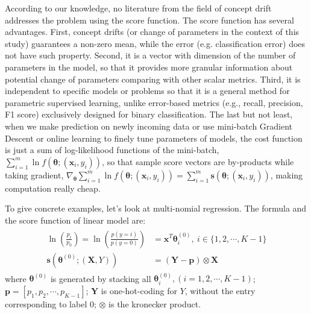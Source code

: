 \documentclass[twoside,11pt]{article}
\begin{document}
According to our knowledge, no literature from the field of concept drift addresses the problem using the score function. The score function has several advantages. First, concept drifts (or change of parameters in the context of this study) guarantees a non-zero mean, while the error (e.g. classification error) does not have such property. Second, it is a vector with dimension of the number of parameters in the model, so that it provides more granular information about potential change of parameters comparing with other scalar metrics. Third, it is independent to specific models or problems so that it is a general method for parametric supervised learning, unlike error-based metrics (e.g., recall, precision, F1 score) exclusively designed for binary classification. The last but not least, when we make prediction on newly incoming data or use mini-batch Gradient Descent or online learning to finely tune parameters of models, the cost function is just a sum of log-likelihood functions of the mini-batch, $\sum _{i=1} ^{m} \ln f(\bm{\theta}; (\bm {x}_i, y_i))$, so that sample score vectors are by-products while taking gradient, $\nabla _{\bm { \theta}} \sum _{i=1} ^{m} \ln f(\bm{\theta}; (\bm {x}_i, y_i)) = \sum_{i=1}^{m} \bm{s}(\bm { \theta};(\bm {x}_i, y_i))$, making computation really cheap. 

To give concrete examples, let's look at multi-nomial regression. The formula and the score function of linear model are:
\begin{align}
\begin{aligned}
\ln (\frac{p_i}{p_0}) = \ln (\frac{p(y=i)}{p(y=0)})&=\bm {x}^{T} \bm { \theta}_i^{(0)}, ~ i \in \{1,2,\cdots,K-1\} \\
\bm {s}(\bm { \theta} ^{ (0)}; (\bm {X}, Y)) &= (\bm {Y}-\bm {p})\otimes \bm {X}
\end{aligned}
\label{eqn:multi_score}
\end{align}
where $\bm { \theta} ^{ (0)}$ is generated by stacking all $ \bm { \theta}_i ^{(0)}, (i=1,2,\cdots,K-1)$; $\bm {p}=[p_1, p_2, \cdots, p _{K-1}]$; $\bm {Y}$ is one-hot-coding for $Y$, without the entry corresponding to label $0$; $\otimes$ is the kronecker product. 
\end{document}
